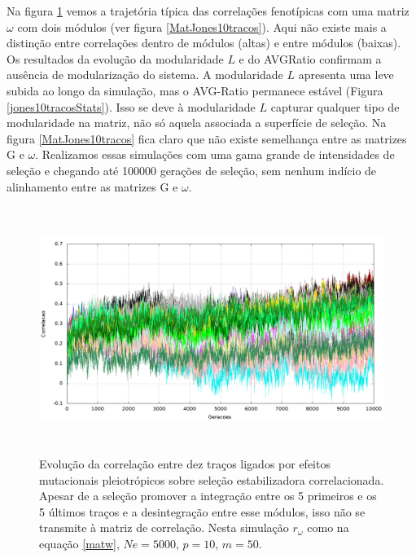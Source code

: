 Na figura \ref{jones10tracos} vemos a trajetória típica das correlações
fenotípicas com uma matriz $\omega$ com dois módulos (ver figura
\ref{MatJones10tracos}).  
Aqui não existe mais a distinção entre
correlações dentro de módulos (altas) e entre módulos (baixas). 
Os resultados da evolução da modularidade $L$ e do AVGRatio confirmam a
ausência de modularização do sistema. 
A modularidade $L$ apresenta uma leve subida ao longo da simulação, mas
o AVG-Ratio permanece estável (Figura \ref{jones10tracosStats}). 
Isso se deve à modularidade $L$ capturar qualquer tipo de modularidade
na matriz, não só aquela associada a superfície de seleção. 
Na figura \ref{MatJones10tracos} fica claro que não existe semelhança
entre as matrizes G e $\omega$. 
Realizamos essas simulações com uma gama grande de intensidades de
seleção e chegando até 100000 gerações de seleção, sem nenhum indício de
alinhamento entre as matrizes G e $\omega$.  

\begin{center}
\begin{figure}[htbp]
  \includegraphics[width=150mm, height=80mm]{figuras/jones10tracos.png}
  \caption{Evolução da correlação entre dez traços ligados por efeitos
  mutacionais pleiotrópicos sobre seleção estabilizadora
  correlacionada. Apesar de a seleção promover a integração entre os
  5 primeiros e os 5 últimos traços e a desintegração entre esse
  módulos, isso não se transmite à matriz de correlação. Nesta simulação
  $r_\omega$ como na equação \ref{matw}, $Ne=5000$, $p=10$, $m=50$.}
  \label{jones10tracos}
\end{figure}
\end{center}

